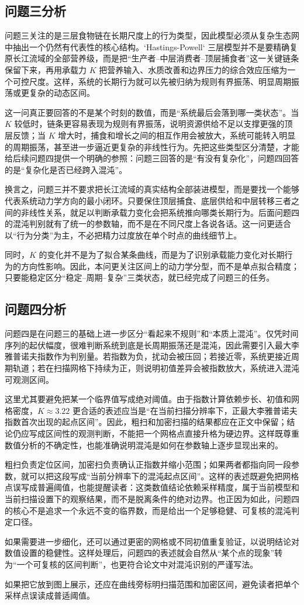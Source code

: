 \subsection{问题三分析}
问题三关注的是三层食物链在长期尺度上的行为类型，因此模型必须从复杂生态网中抽出一个仍然有代表性的核心结构。`Hastings-Powell` 三层模型并不是要精确复原长江流域的全部营养级，而是把“生产者--中层消费者--顶层捕食者”这一关键链条保留下来，再用承载力 \(K\) 把营养输入、水质改善和边界压力的综合效应压缩为一个可控尺度。这样，系统的长期行为就可以先被归纳为规则有界振荡、明显周期振荡或更复杂的动态区间。

这一问真正要回答的不是某个时刻的数值，而是“系统最后会落到哪一类状态”。当 \(K\) 较低时，链条更容易表现为规则有界振荡，说明资源供给不足以支撑更强的顶层反馈；当 \(K\) 增大时，捕食和增长之间的相互作用会被放大，系统可能转入明显的周期振荡，甚至进一步逼近更复杂的非线性行为。先把这些类型区分清楚，才能给后续问题四提供一个明确的参照：问题三回答的是“有没有复杂化”，问题四回答的是“复杂化是否已经跨入混沌”。

换言之，问题三并不要求把长江流域的真实结构全部装进模型，而是要找一个能够代表系统动力学方向的最小闭环。只要保住顶层捕食、底层供给和中层转移三者之间的非线性关系，就足以判断承载力变化会把系统推向哪类长期行为。后面问题四的混沌判别就有了统一的参数轴，而不是在不同尺度上各说各话。这一问更适合以“行为分类”为主，不必把精力过度放在单个时点的曲线细节上。

同时，\(K\) 的变化并不是为了拟合某条曲线，而是为了识别承载能力变化对长期行为的方向性影响。因此，本问更关注区间上的动力学分型，而不是单点拟合精度；只要能稳定区分“稳定--周期--复杂”三类状态，就已经完成了问题三的任务。

\subsection{问题四分析}
问题四是在问题三的基础上进一步区分“看起来不规则”和“本质上混沌”。仅凭时间序列的起伏幅度，很难判断系统到底是长周期振荡还是混沌，因此需要引入最大李雅普诺夫指数作为判别量。若指数为负，扰动会被压回；若接近零，系统更接近周期轨道；若在扫描网格下持续为正，则说明初值差异会被指数放大，系统进入混沌可观测区间。

这里尤其要避免把某一个临界值写成绝对阈值。由于指数计算依赖步长、初值和网格密度，\(K\approx 3.22\) 更合适的表述应当是“在当前扫描分辨率下，正最大李雅普诺夫指数首次出现的起点区间”。因此，粗扫和加密扫描的结果都应在正文中保留；结论仍应写成区间性的观测判断，不能把一个网格点直接升格为硬边界。这样既尊重数值分析的不确定性，也能准确说明混沌是如何在参数轴上逐步显现出来的。

粗扫负责定位区间，加密扫负责确认正指数并缩小范围；如果两者都指向同一段参数，就可以把这段写成“当前分辨率下的混沌起点区间”。这样的表述既避免把网格点误写成普遍阈值，也能提醒读者：这类数值结论依赖采样精度，属于当前模型和当前扫描设置下的观察结果，而不是脱离条件的绝对边界。也正因为如此，问题四的核心不是追求一个永远不变的临界数，而是给出一个足够稳健、可复核的混沌判定口径。

如果需要进一步细化，还可以通过更密的网格或不同初值重复验证，以说明结论对数值设置的稳健性。这样处理后，问题四的表述就会自然从“某个点的现象”转为“一个可复核的区间判断”，也更符合论文中对混沌识别的严谨写法。

如果把它放到图上展示，还应在曲线旁标明扫描范围和加密区间，避免读者把单个采样点误读成普适阈值。
